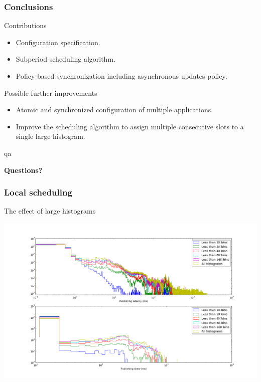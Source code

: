 \documentclass[]{prezentare}
\begin{document}
\begin{frame}
	\frametitle{Conclusions}

	\begin{block}{Contributions}
	\begin{itemize}
	\item Configuration specification.
	\item Subperiod scheduling algorithm.
	\item Policy-based synchronization including asynchronous updates policy.
	\end{itemize}		
	\end{block}

	\begin{block}{Possible further improvements}
	\begin{itemize}
	\item Atomic and synchronized configuration of multiple applications.
	\item Improve the scheduling algorithm to assign multiple consecutive slots to a single large histogram.
	\end{itemize}		
	\end{block}

\end{frame}
    \begin{frame}

    \begin{beamercolorbox}[rounded=true,shadow=true]{qa}
    \begin{center}
        {\Huge \textbf{Questions?}}
    \end{center}
    \end{beamercolorbox}
    \end{frame}

	\begin{frame}
	\frametitle{Local scheduling}
	\begin{block}{The effect of large histograms}
	
	\begin{center}
	\includegraphics[width=\textwidth]{../Images/e2e_histograms}
	\end{center}
	
	\end{block}
	\end{frame}
\end{document}
